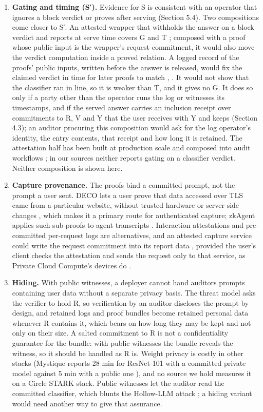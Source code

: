 \documentclass[11pt]{article}
\begin{document}
\begin{enumerate}
\item \textbf{Gating and timing (S′).} Evidence for S is consistent with an operator that ignores a block verdict or proves after serving (Section 5.4). Two compositions come closer to S′. An attested wrapper that withholds the answer on a block verdict and reports at serve time covers G and T \cite{B24}; composed with a proof whose public input is the wrapper's request commitment, it would also move the verdict computation inside a proved relation. A logged record of the proofs' public inputs, written before the answer is released, would fix the claimed verdict in time for later proofs to match \cite{C16}, \cite{C18}. It would not show that the classifier ran in line, so it is weaker than T, and it gives no G. It does so only if a party other than the operator runs the log or witnesses its timestamps, and if the served answer carries an inclusion receipt over commitments to R, V and Y that the user receives with Y and keeps (Section 4.3); an auditor procuring this composition would ask for the log operator's identity, the entry contents, that receipt and how long it is retained. The attestation half has been built at production scale \cite{B26} and composed into audit workflows \cite{B25}; in our sources neither reports gating on a classifier verdict. Neither composition is shown here.
\item \textbf{Capture provenance.} The proofs bind a committed prompt, not the prompt a user sent. DECO lets a user prove that data accessed over TLS came from a particular website, without trusted hardware or server-side changes \cite{F4}, which makes it a primary route for authenticated capture; zkAgent applies such sub-proofs to agent transcripts \cite{A19}. Interaction attestations \cite{B23} and pre-committed per-request logs \cite{C13} are alternatives, and an attested capture service could write the request commitment into its report data \cite{B2}, provided the user's client checks the attestation and sends the request only to that service, as Private Cloud Compute's devices do \cite{B26}.
\item \textbf{Hiding.} With public witnesses, a deployer cannot hand auditors prompts containing user data without a separate privacy basis. The threat model asks the verifier to hold R, so verification by an auditor discloses the prompt by design, and retained logs and proof bundles become retained personal data whenever R contains it, which bears on how long they may be kept and not only on their size. A salted commitment to R is not a confidentiality guarantee for the bundle: with public witnesses the bundle reveals the witness, so it should be handled as R is. Weight privacy is costly in other stacks (Mystique reports 28 min for ResNet-101 with a committed private model against 5 min with a public one \cite{A6}), and no source we hold measures it on a Circle STARK stack. Public witnesses let the auditor read the committed classifier, which blunts the Hollow-LLM attack \cite{A23}; a hiding variant would need another way to give that assurance.

\end{enumerate}
\end{document}
